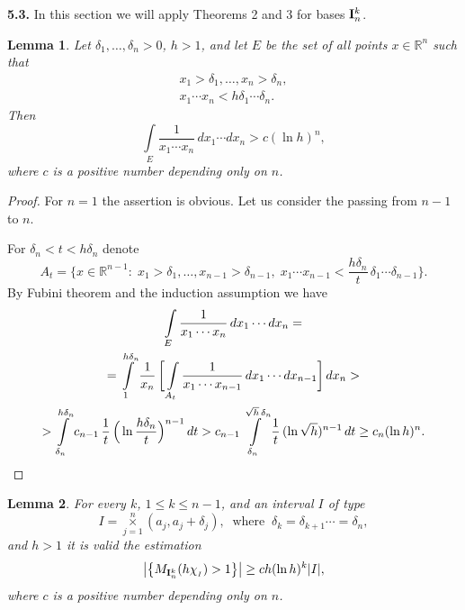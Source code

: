\documentclass[12pt,reqno]{article}
\newtheorem{lemma}{Lemma}
\theoremstyle{remark}
\begin{document}
\noindent \textbf{5.3.} In this section we will apply Theorems 2 and 3 for bases $\bold{I}_n^k$.

\begin{lemma}\label{lem:9}
Let $\delta_1,\dots,\delta_n>0$, $h>1$, and let $E$ be the set of all points $x\in\mathbb{R}^n$ such that
\begin{gather*}
    x_1>\delta_1,\dots,x_n>\delta_n, \\
    x_1\cdots x_n<h\delta_1\cdots\delta_n.
\end{gather*}
Then
$$  \int\limits_E \frac{1}{x_1\cdots x_n}\,dx_1\cdots dx_n>c(\ln h)^n,     $$
where $c$ is a positive number depending only on $n$.
\end{lemma}

\begin{proof}
For $n=1$ the assertion is obvious. Let us consider the passing from $n-1$ to $n$.

For $\delta_n<t<h\delta_n$ denote
$$  A_t=\Big\{x\in\mathbb{R}^{n-1}:\;x_1>\delta_1,\dots,x_{n-1}>\delta_{n-1},\;x_1\cdots x_{n-1}<\frac{h\delta_n}{t}\,\delta_1\cdots\delta_{n-1}\Big\}.   $$
By Fubini theorem and the induction assumption we have
\begin{multline*}
    \int\limits_E \frac{1}{x_1\cdots x_n}\,dx_1\cdots dx_n= \\
    =\int\limits_1^{h\delta_n} \frac{1}{x_n}\,\bigg[\int\limits_{A_t} \frac{1}{x_1\cdots x_{n-1}}\,dx_1\cdots dx_{n-1}\bigg]\,dx_n> \\
    >\int\limits_{\delta_n}^{h\delta_n} c_{n-1}\,\frac{1}{t}\,\Big(\ln\frac{h\delta_n}{t}\Big)^{n-1}\,dt>
            c_{n-1}\int\limits_{\delta_n}^{\sqrt{h}\,\delta_n} \frac{1}{t}\,(\ln\sqrt{h})^{n-1}\,dt\geq c_n(\ln h)^n. \qedhere
\end{multline*}
\end{proof}

\begin{lemma}\label{lem:10}
For every $k$, $1\leq k\leq n-1$, and an interval $I$ of type
$$  I=\underset{j=1}{\overset{n}{\times}} (a_j,a_j+\delta_j), \;\;\text{where}\;\; \delta_k=\delta_{k+1}\cdots=\delta_n,      $$
and $h>1$ it is valid the estimation
$$  \big|\big\{M_{\bold{I}_n^k}(h\chi_{{}_I})>1\big\}\big|\geq ch(\ln h)^{k}|I|,     $$
where $c$ is a positive number depending only on $n$.
\end{lemma}
\end{document}

